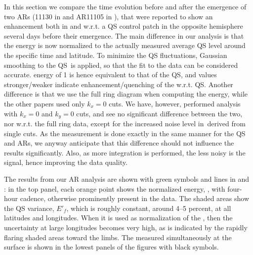 \documentclass{aa}
\begin{document}
In this section we compare the \fff time evolution before and after the emergence of 
two ARs (11130 in  and AR11105 in ), that were reported to show an enhancement both in \cite{SRB16} and \cite{Waidele22} w.r.t. a QS control patch
in the opposite hemisphere several days before their emergence. The main difference in our analysis
is that the \fff energy is now normalized to the actually measured average QS level
around the specific time and latitude. To minimize
the QS fluctuations, Gaussian smoothing to the QS \ef\,is applied, 
so that the fit to the data can be considered accurate.
\fff energy of 1 is hence
equivalent to that of the QS, and values stronger/weaker 
indicate enhancement/quenching of the \fff w.r.t. QS.
Another difference is that we use the
full ring diagram when computing the \fff energy, while the
other papers used only $k_x=0$ cuts. We have, however, performed
analysis with $k_x=0$ and $k_y=0$ cuts, and see no significant
difference between the two, nor w.r.t. the full ring data, except for the
increased noise level in \ef\,derived from single cuts.
As the measurement is done exactly in the same
manner for the QS and ARs, we anyway anticipate
that this difference should not influence the results significantly. 
Also, as more integration is performed, the less noisy is the 
signal, hence improving the data quality. 

The results from our AR analysis are shown with green symbols and lines in  and : in the top panel, each orange point shows the normalized \fff energy, \eft, with four-hour cadence,  otherwise prominently present in the data. The shaded areas show the QS variance, $E'_f$, which is roughly constant, around 4--5 percent, at all latitudes and longitudes. When it is used as normalization of the \fffns, then the uncertainty at large longitudes becomes very high, as is indicated by the rapidly flaring shaded areas toward the limbs. The \brms{} measured simultaneously at the surface is shown in the lowest panels of the figures with black symbols. 
\end{document}
